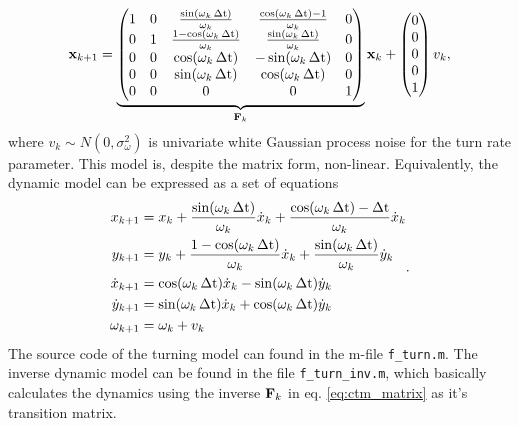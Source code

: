 \begin{equation}
%
\vec{x}_{k+1} = \underbrace{\begin{pmatrix} 1 & 0 &
\frac{\sin(\omega_{k} \dt)}{\omega_{k}} & \frac{\cos(\omega_{k} \dt)
-1}{\omega_{k}} & 0 \\ 0 & 1 & \frac{1-\cos(\omega_{k}
\dt)}{\omega_{k}} & \frac{\sin(\omega_{k} \dt)}{\omega_{k}} & 0 \\ 0 &
0 & \cos(\omega_{k} \dt) & -\sin(\omega_{k} \dt) & 0 \\ 0 & 0 &
\sin(\omega_{k} \dt) & \cos(\omega_{k} \dt) & 0 \\ 0 & 0 & 0 & 0 & 1\\
\end{pmatrix}}_{\mat{F}_k} \vec{x}_k + \begin{pmatrix} 0 \\ 0 \\ 0 \\
0 \\ 1 \\
\end{pmatrix} v_k, \label{eq:ctm_matrix}
% 
\end{equation}
% 
where $v_k \sim N(0,\sigma_{\omega}^2)$ is univariate white Gaussian
process noise for the turn rate parameter. This model is, despite the
matrix form, non-linear. Equivalently, the dynamic model can be
expressed as a set of equations
%
\begin{equation}
\begin{split} x_{k+1} & = x_k + \frac{\sin(\omega_{k}
\operatorname{\Delta t})}{\omega_{k}} \dot{x}_k + \frac{\cos(\omega_{k} \operatorname{\Delta t}) -
\operatorname{\Delta t}}{\omega_{k}} \dot{x}_k \\ y_{k+1} & = y_k +
\frac{1-\cos(\omega_{k} \operatorname{\Delta t})}{\omega_{k}} \dot{x}_k +
\frac{\sin(\omega_{k} \operatorname{\Delta t})}{\omega_{k}} \dot{y}_k \\ \dot{x}_{k+1} & =
\cos(\omega_{k} \operatorname{\Delta t}) \dot{x}_k - \sin(\omega_{k} \operatorname{\Delta t}) \dot{y}_k \\
\dot{y}_{k+1} & = \sin(\omega_{k} \operatorname{\Delta t}) \dot{x}_k + \cos(\omega_{k}
\operatorname{\Delta t}) \dot{y}_k \\ \omega_{k+1} & = \omega_k + v_k
\end{split}.
\end{equation}
%
The source code of the turning model can found in the m-file
\texttt{f\_turn.m}. The inverse dynamic model can be found in the file
\texttt{f\_turn\_inv.m}, which basically calculates the dynamics using
the inverse $\mathbf{F}_k$ in eq. \eqref{eq:ctm_matrix} as it's
transition matrix.

